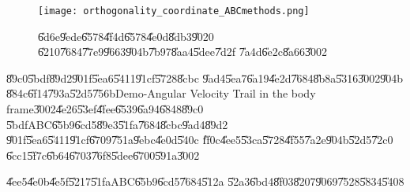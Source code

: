 \begin{figure}[th]
\caption{\U{6d6e}\U{9ede}\U{6578}\U{4f4d}\U{6578}\U{4e0d}\U{8db3}\U{9020}%
\U{6210}\U{7684}\U{77e9}\U{9663}\U{904b}\U{7b97}\U{8aa4}\U{5dee}\U{7d2f}%
\U{7a4d}\U{6e2c}\U{8a66}\U{3002}}
\begin{center}
\texttt{[image: orthogonality\_coordinate\_ABCmethods.png]}
\end{center}
\end{figure}

\clearpage%

\begin{case}
\U{89c0}\U{5bdf}\U{89d2}\U{901f}\U{5ea6}\U{5411}\U{91cf}\U{5728}\U{8cbc}%
\U{9ad4}\U{5ea7}\U{6a19}\U{4e2d}\U{7684}\U{8b8a}\U{5316}\U{3002}\U{904b}%
\U{884c}\U{6f14}\U{793a}\U{52d5}\U{756b}Demo-Angular Velocity Trail in the
body frame\U{3002}\U{4e26}\U{53ef}\U{4fee}\U{6539}\U{6a94}\U{6848}\U{89c0}%
\U{5bdf}ABC\U{65b9}\U{6cd5}\U{89e3}\U{51fa}\U{7684}\U{8cbc}\U{9ad4}\U{89d2}%
\U{901f}\U{5ea6}\U{5411}\U{91cf}\U{6709}\U{751a}\U{9ebc}\U{4e0d}\U{540c}%
\U{ff0c}\U{4ee5}\U{53ca}\U{5728}\U{4f55}\U{7a2e}\U{904b}\U{52d5}\U{72c0}%
\U{6cc1}\U{5f7c}\U{6b64}\U{6703}\U{76f8}\U{5dee}\U{6700}\U{591a}\U{3002}
\end{case}

\begin{case}
\U{4ee5}\U{4e0b}\U{4e5f}\U{5217}\U{51fa}ABC\U{65b9}\U{6cd5}\U{7684}\U{512a}%
\U{52a3}\U{6bd4}\U{8f03}\U{8207}\U{9069}\U{7528}\U{5834}\U{5408}
\end{case}

%
\begin{center}

\end{center}%

%
